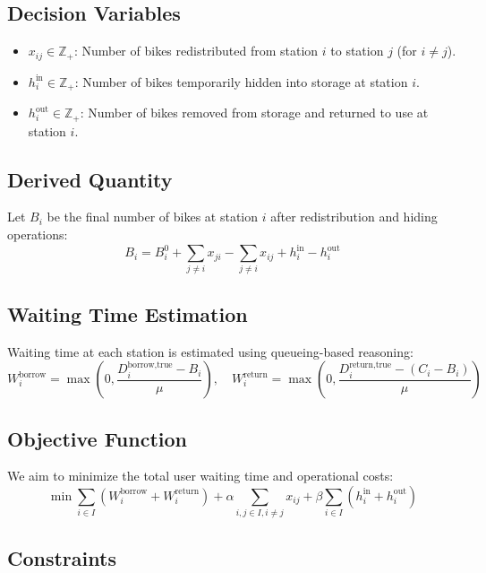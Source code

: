 \documentclass[11pt,a4paper]{article}
\begin{document}
\subsection*{Decision Variables}

\begin{itemize}
    \item $x_{ij} \in \mathbb{Z}_+$: Number of bikes redistributed from station $i$ to station $j$ (for $i \ne j$).
    \item $h_i^{\text{in}} \in \mathbb{Z}_+$: Number of bikes temporarily hidden into storage at station $i$.
    \item $h_i^{\text{out}} \in \mathbb{Z}_+$: Number of bikes removed from storage and returned to use at station $i$.
\end{itemize}

\subsection*{Derived Quantity}

Let $B_i$ be the final number of bikes at station $i$ after redistribution and hiding operations:
\[
B_i = B_i^0 + \sum_{j \ne i} x_{ji} - \sum_{j \ne i} x_{ij} + h_i^{\text{in}} - h_i^{\text{out}}
\]

\subsection*{Waiting Time Estimation}

Waiting time at each station is estimated using queueing-based reasoning:
\[
W_i^{\text{borrow}} = \max\left(0, \frac{D_i^{\text{borrow,true}} - B_i}{\mu} \right), \quad
W_i^{\text{return}} = \max\left(0, \frac{D_i^{\text{return,true}} - (C_i - B_i)}{\mu} \right)
\]

\subsection*{Objective Function}

We aim to minimize the total user waiting time and operational costs:
\[
\min \sum_{i \in I} \left( W_i^{\text{borrow}} + W_i^{\text{return}} \right)
+ \alpha \sum_{i,j \in I, i \ne j} x_{ij}
+ \beta \sum_{i \in I} \left( h_i^{\text{in}} + h_i^{\text{out}} \right)
\]

\subsection*{Constraints}
\end{document}
